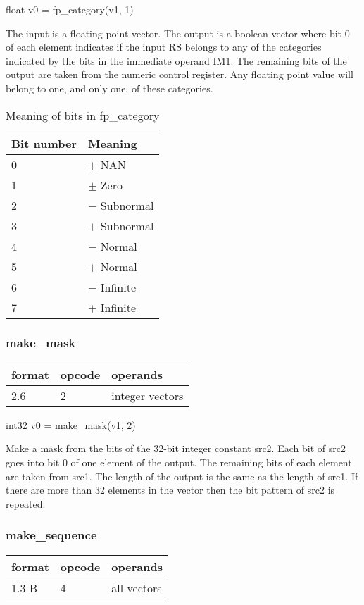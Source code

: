 \documentclass[forwardcom.tex]{subfiles}
\begin{document}
float v0 = fp\_category(v1, 1)
\vspace{2mm}

The input is a floating point vector. The output is a boolean vector where bit 0 of each element indicates if the input RS belongs to any of the categories indicated by the bits in the immediate operand IM1. The remaining bits of the output are taken from the numeric control register. 
Any floating point value will belong to one, and only one, of these categories. 

\begin{longtable} {|p{20mm}|p{90mm}|}
\caption{Meaning of bits in fp\_category} 
\label{table:fpCategoryInstructionBits} \\
\endfirsthead
\endhead
\hline
\bfseries Bit number & \bfseries Meaning  \\
\hline
0 & $\pm$ NAN \\
1 & $\pm$ Zero \\
2 & $-$ Subnormal \\
3 & $+$ Subnormal \\
4 & $-$ Normal \\
5 & $+$ Normal \\
6 & $-$ Infinite  \\
7 & $+$ Infinite  \\
\hline
\end{longtable}

\subsubsection{make\_mask}
\label{table:makeMaskInstruction}
\begin{tabular}{|p{12mm}|p{12mm}|p{110mm}|}
\hline
\bfseries format & \bfseries opcode & \bfseries operands \\ \hline
2.6 &  2 & integer vectors \\ \hline
\end{tabular}
\vspace{2mm}

int32 v0 = make\_mask(v1, 2)
\vspace{2mm}

Make a mask from the bits of the 32-bit integer constant src2. Each bit of src2 goes into bit 0 of one element of the output. The remaining bits of each element are taken from src1. The length of the output is the same as the length of src1. If there are more than 32 elements in the vector then the bit pattern of src2 is repeated.

\subsubsection{make\_sequence}
\label{table:makeSequenceInstruction}
\begin{tabular}{|p{12mm}|p{12mm}|p{110mm}|}
\hline
\bfseries format & \bfseries opcode & \bfseries operands \\ \hline
1.3 B &  4 & all vectors \\ \hline
\end{tabular}
\vspace{2mm}
\end{document}
